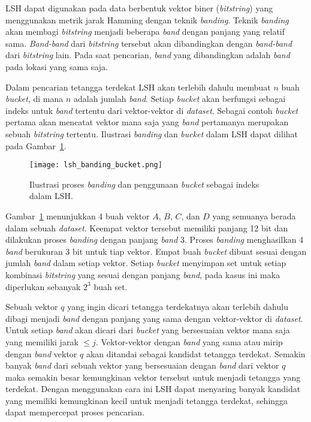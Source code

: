 LSH dapat digunakan pada data berbentuk vektor biner (\textit{bitstring}) yang menggunakan metrik jarak Hamming dengan teknik \textit{banding}. Teknik \textit{banding} akan membagi \textit{bitstring} menjadi beberapa \textit{band} dengan panjang yang relatif sama. \textit{Band-band} dari \textit{bitstring} tersebut akan dibandingkan dengan \textit{band-band} dari \textit{bitstring} lain. Pada saat pencarian, \textit{band} yang dibandingkan adalah \textit{band} pada lokasi yang sama saja. 

Dalam pencarian tetangga terdekat LSH akan terlebih dahulu membuat $n$ buah \textit{bucket}, di mana $n$ adalah jumlah \textit{band}. Setiap \textit{bucket} akan berfungsi sebagai indeks untuk \textit{band} tertentu dari vektor-vektor di \textit{dataset}. Sebagai contoh \textit{bucket} pertama akan mencatat vektor mana saja yang \textit{band} pertamanya merupakan sebuah \textit{bitstring} tertentu. Ilustrasi \textit{banding} dan \textit{bucket} dalam LSH dapat dilihat pada Gambar~\ref{fig:lsh_banding_bucket}. 

\begin{figure}
	\centering
	\texttt{[image: lsh\_banding\_bucket.png]}
	\caption{Ilustrasi proses \textit{banding} dan penggunaan \textit{bucket} sebagai indeks dalam LSH.}
	\label{fig:lsh_banding_bucket}
\end{figure}

Gambar~\ref{fig:lsh_banding_bucket} menunjukkan 4 buah vektor $A$, $B$, $C$, dan $D$ yang semuanya berada dalam sebuah \textit{dataset}. Keempat vektor tersebut memiliki panjang 12 bit dan dilakukan proses \textit{banding} dengan panjang \textit{band} 3. Proses \textit{banding} menghasilkan 4 \textit{band} berukuran 3 bit untuk tiap vektor. Empat buah \textit{bucket} dibuat sesuai dengan jumlah \textit{band} dalam setiap vektor. Setiap \textit{bucket} menyimpan set untuk setiap kombinasi \textit{bitstring} yang sesuai dengan panjang \textit{band}, pada kasus ini maka diperlukan sebanyak $2^{3}$ buah set. 

Sebuah vektor $q$ yang ingin dicari tetangga terdekatnya akan terlebih dahulu dibagi menjadi \textit{band} dengan panjang yang sama dengan vektor-vektor di \textit{dataset}. Untuk setiap \textit{band} akan dicari dari \textit{bucket} yang bersesuaian vektor mana saja yang memiliki jarak $\leq j$. Vektor-vektor dengan \textit{band} yang sama atau mirip dengan \textit{band} vektor $q$ akan ditandai sebagai kandidat tetangga terdekat. Semakin banyak \textit{band} dari sebuah vektor yang bersesuaian dengan \textit{band} dari vektor $q$ maka semakin besar kemungkinan vektor tersebut untuk menjadi tetangga yang terdekat. Dengan menggunakan cara ini LSH dapat menyaring banyak kandidat yang memiliki kemungkinan kecil untuk menjadi tetangga terdekat, sehingga dapat mempercepat proses pencarian.

